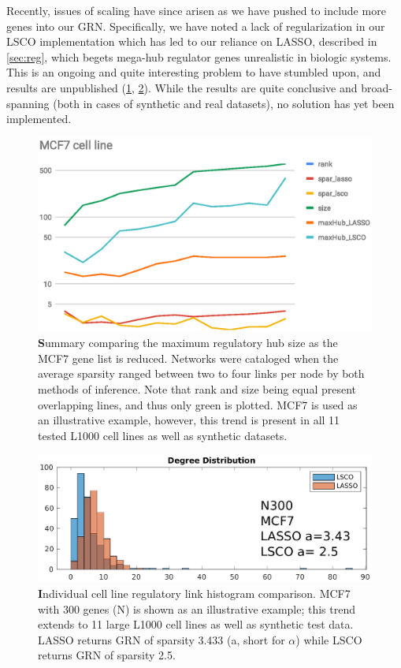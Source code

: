 Recently, issues of scaling have since arisen as we have pushed to include more genes into our GRN. Specifically, we have noted a lack of regularization in our LSCO implementation which has led to our reliance on LASSO, described in \cref{sec:reg}, which begets mega-hub regulator genes unrealistic in biologic systems. This is an ongoing and quite interesting problem to have stumbled upon, and results are unpublished (\cref{fig:scaling}, \cref{fig:hubiness}). While the results are quite conclusive and broad-spanning (both in cases of synthetic and real datasets), no solution has yet been implemented.
\begin{figure}[H]
\centering
\includegraphics[width=.75\linewidth]{3/MCF7_cell_line.eps}
\caption{{\textbf Summary comparing the maximum regulatory hub size as the MCF7 gene list is reduced.} Networks were cataloged when the average sparsity ranged between two to four links per node by both methods of inference. Note that rank and size being equal present overlapping lines, and thus only green is plotted. MCF7 is used as an illustrative example, however, this trend is present in all 11 tested L1000 cell lines as well as synthetic datasets.
}
\label{fig:scaling}
\end{figure}

\begin{figure}[H]
\centering
\includegraphics[width=.75\linewidth]{3/hubineess.eps}
\caption{{\textbf Individual cell line regulatory link histogram comparison.} MCF7 with 300 genes (N) is shown as an illustrative example; this trend extends to 11 large L1000 cell lines as well as synthetic test data. LASSO returns GRN of sparsity 3.433 (a, short for $\alpha$) while LSCO returns GRN of sparsity 2.5.
}
\label{fig:hubiness}
\end{figure}




